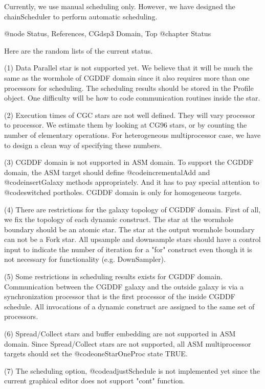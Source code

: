 {Currently, we use manual scheduling only. However, we have designed
the chainScheduler to perform automatic scheduling.
 
@node Status, References, CGdsp3 Domain, Top
@chapter Status

Here are the random lists of the current status.

(1) Data Parallel star is not supported yet. We believe that it will be
much the same as the wormhole of CGDDF domain since it also requires more than
one processors for scheduling. The scheduling results should be stored in 
the Profile object. One difficulty will be how to code communication routines
inside the star.

(2) Execution times of CGC stars are not well defined. They will vary
processor to processor. We estimate them by looking at CG96 stars, or
by counting the number of elementary operations. For heterogeneous
multiprocessor case, we have to design a clean way of specifying these numbers.

(3) CGDDF domain is not supported in ASM domain. To support the CGDDF domain,
the ASM target should define @code{incrementalAdd} and @code{insertGalaxy}
methods appropriately. And it has to pay special attention to
@code{switched} portholes. CGDDF domain is only for homogeneous targets.

(4) There are restrictions for the galaxy topology of CGDDF domain. First of
all, we fix the topology of each dynamic construct. The star at the wormhole
boundary should be an atomic star. The star at the output wormhole boundary
can not be a Fork star. All upsample and downsample stars should have a
control input to indicate the number of iteration for a "for" construct
even though it is not necessary for functionality (e.g. DownSampler).

(5) Some restrictions in scheduling results exists for CGDDF domain.
Communication between the CGDDF galaxy and the outside galaxy is via
a synchronization processor that is the first processor of the inside
CGDDF schedule. All invocations of a dynamic construct are assigned to the
same set of processors.
 
(6) Spread/Collect stars and buffer embedding are not supported in ASM domain.
Since Spread/Collect stars are not supported, all ASM multiprocessor
targets should set the @code{oneStarOneProc} state TRUE.

(7) The scheduling option, @code{adjustSchedule} is not implemented yet since
the current graphical editor does not support "cont" function.

}
